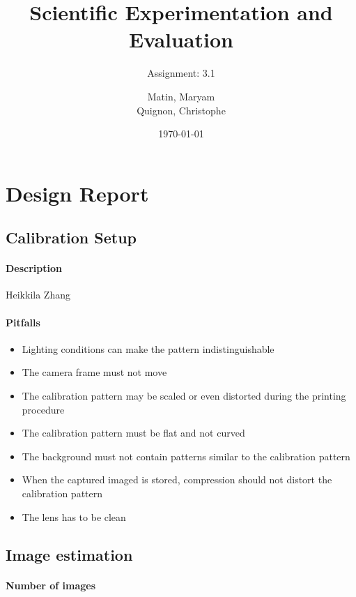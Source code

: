 \documentclass{scrartcl}
\begin{document}
\title{Scientific Experimentation and Evaluation
}
\subtitle{
Assignment: 3.1}
\author{
  Matin, Maryam \\
  Quignon, Christophe
}
\date{\today}


\maketitle


\section{Design Report}

\subsection{Calibration Setup}
\paragraph{Description}
Heikkila\cite{heikkila}
Zhang\cite{zhang}

\paragraph{Pitfalls}
\begin{itemize}
\item Lighting conditions can make the pattern indistinguishable
\item The camera frame must not move
\item The calibration pattern may be scaled or even distorted during the printing procedure
\item The calibration pattern must be flat and not curved
\item The background must not contain patterns similar to the calibration pattern
\item When the captured imaged is stored, compression should not distort the calibration pattern
\item The lens has to be clean
\end{itemize}


\subsection{Image estimation}
\paragraph{Number of images}
\end{document}
